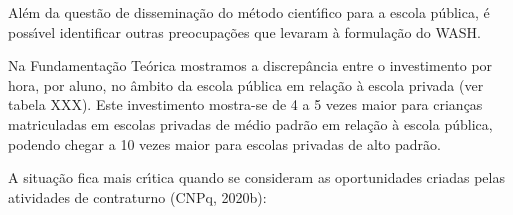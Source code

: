 \documentclass[
12pt,		%
openright,	%
twoside,  %
a4paper,			%
chapter=TITLE,		%
english,			%
french,				%
spanish,			%
brazil				%
]{USPSC-classe/USPSC}
\begin{document}
Al\'em da quest\~ao de dissemina\c{c}\~ao do m\'etodo cient\'{\i}fico para a escola p\'ublica, \'e poss\'{\i}vel identificar outras preocupa\c{c}\~oes que levaram \`a formula\c{c}\~ao do WASH.

















Na Fundamenta\c{c}\~ao Te\'orica mostramos a discrep\^ancia entre o investimento por hora, por aluno, no \^ambito da escola p\'ublica em rela\c{c}\~ao \`a escola privada (ver tabela XXX). Este investimento mostra-se de 4 a 5 vezes maior para crian\c{c}as matriculadas em escolas privadas de m\'edio padr\~ao em rela\c{c}\~ao \`a escola p\'ublica, podendo chegar a 10 vezes maior para escolas privadas de alto padr\~ao.

















A situa\c{c}\~ao fica mais cr\'{\i}tica quando se consideram as oportunidades criadas pelas atividades de contraturno  (CNPq, 2020b):


















\noindent\begin{center}\mbox{\centering{}}\end{center}
\end{document}
